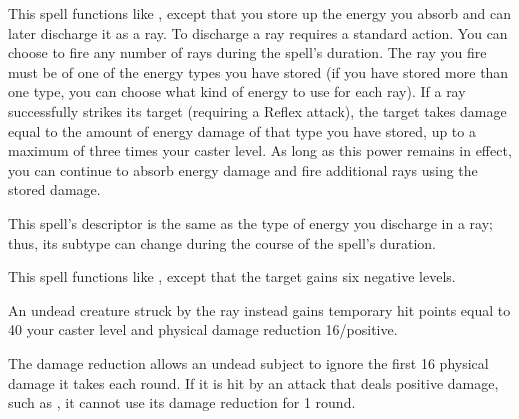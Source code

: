 \begin{spelleffect}
  This spell functions like , except that you store up the energy you absorb and can later discharge it as a ray. To discharge a ray requires a standard action. You can choose to fire any number of rays during the spell's duration. The ray you fire must be of one of the energy types you have stored (if you have stored more than one type, you can choose what kind of energy to use for each ray). If a ray successfully strikes its target (requiring a Reflex attack), the target takes damage equal to the amount of energy damage of that type you have stored, up to a maximum of three times your caster level. As long as this power remains in effect, you can continue to absorb energy damage and fire additional rays using the stored damage.
\end{spelleffect}
\begin{spellnotes}
  This spell's descriptor is the same as the type of energy you discharge in a ray; thus, its subtype can change during the course of the spell's duration.
\end{spellnotes}

\begin{spelleffect}
  This spell functions like , except that the target gains six negative levels.
  \par An undead creature struck by the ray instead gains temporary hit points equal to 40 \add your caster level and physical damage reduction 16/positive. 
\end{spelleffect}
\begin{spellnotes}
  The damage reduction allows an undead subject to ignore the first 16 physical damage it takes each round. If it is hit by an attack that deals positive damage, such as , it cannot use its damage reduction for 1 round.
\end{spellnotes}

